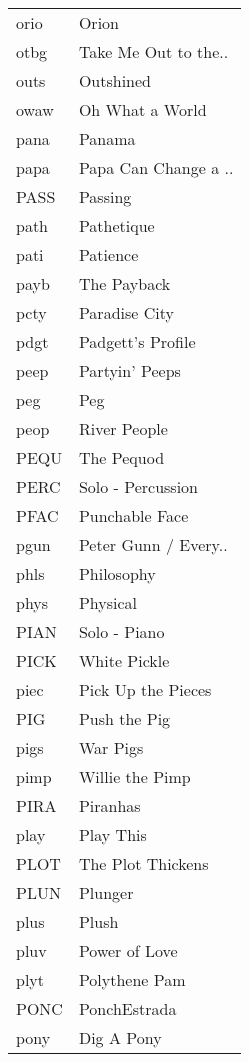 \begin{supertabular}{ll}
 orio &                 Orion \\
 otbg &  Take Me Out to the.. \\
 outs &             Outshined \\
 owaw &       Oh What a World \\
 pana &                Panama \\
 papa &  Papa Can Change a .. \\
 PASS &               Passing \\
 path &            Pathetique \\
 pati &              Patience \\
 payb &           The Payback \\
 pcty &         Paradise City \\
 pdgt &     Padgett's Profile \\
 peep &        Partyin' Peeps \\
  peg &                   Peg \\
 peop &          River People \\
 PEQU &            The Pequod \\
 PERC &     Solo - Percussion \\
 PFAC &        Punchable Face \\
 pgun &  Peter Gunn / Every.. \\
 phls &            Philosophy \\
 phys &              Physical \\
 PIAN &          Solo - Piano \\
 PICK &          White Pickle \\
 piec &    Pick Up the Pieces \\
  PIG &          Push the Pig \\
 pigs &              War Pigs \\
 pimp &       Willie the Pimp \\
 PIRA &              Piranhas \\
 play &             Play This \\
 PLOT &     The Plot Thickens \\
 PLUN &               Plunger \\
 plus &                 Plush \\
 pluv &         Power of Love \\
 plyt &         Polythene Pam \\
 PONC &          PonchEstrada \\
 pony &            Dig A Pony \\

\end{supertabular}
